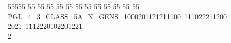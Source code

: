%
%
\begin{tabbing}
55555 \= 55 \= 55 \= 55 \= 55 \= 55 \= 55 \= 55 \= 55 \= 55 \= 55 \= 55 \= 55 \= \>PGL\_4\_3\_CLASS\_5A\_N\_GENS=1000201121211100\ 111022211200\\[0pt]
\>2021\ 1112220102201221\\[0pt]
2\>\end{tabbing}

